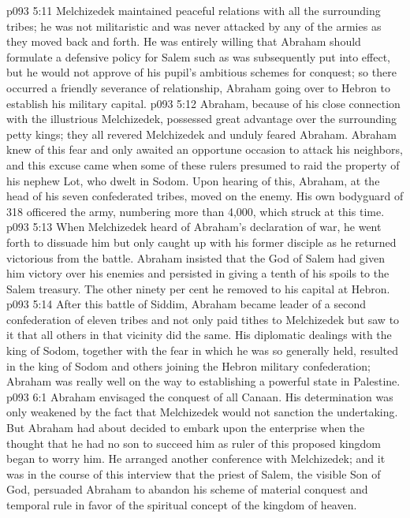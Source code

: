 \vs p093 5:11 Melchizedek maintained peaceful relations with all the surrounding tribes; he was not militaristic and was never attacked by any of the armies as they moved back and forth. He was entirely willing that Abraham should formulate a defensive policy for Salem such as was subsequently put into effect, but he would not approve of his pupil’s ambitious schemes for conquest; so there occurred a friendly severance of relationship, Abraham going over to Hebron to establish his military capital.
\vs p093 5:12 Abraham, because of his close connection with the illustrious Melchizedek, possessed great advantage over the surrounding petty kings; they all revered Melchizedek and unduly feared Abraham. Abraham knew of this fear and only awaited an opportune occasion to attack his neighbors, and this excuse came when some of these rulers presumed to raid the property of his nephew Lot, who dwelt in Sodom. Upon hearing of this, Abraham, at the head of his seven confederated tribes, moved on the enemy. His own bodyguard of 318 officered the army, numbering more than 4,000, which struck at this time.
\vs p093 5:13 When Melchizedek heard of Abraham’s declaration of war, he went forth to dissuade him but only caught up with his former disciple as he returned victorious from the battle. Abraham insisted that the God of Salem had given him victory over his enemies and persisted in giving a tenth of his spoils to the Salem treasury. The other ninety per cent he removed to his capital at Hebron.
\vs p093 5:14 After this battle of Siddim, Abraham became leader of a second confederation of eleven tribes and not only paid tithes to Melchizedek but saw to it that all others in that vicinity did the same. His diplomatic dealings with the king of Sodom, together with the fear in which he was so generally held, resulted in the king of Sodom and others joining the Hebron military confederation; Abraham was really well on the way to establishing a powerful state in Palestine.
\vs p093 6:1 Abraham envisaged the conquest of all Canaan. His determination was only weakened by the fact that Melchizedek would not sanction the undertaking. But Abraham had about decided to embark upon the enterprise when the thought that he had no son to succeed him as ruler of this proposed kingdom began to worry him. He arranged another conference with Melchizedek; and it was in the course of this interview that the priest of Salem, the visible Son of God, persuaded Abraham to abandon his scheme of material conquest and temporal rule in favor of the spiritual concept of the kingdom of heaven.
